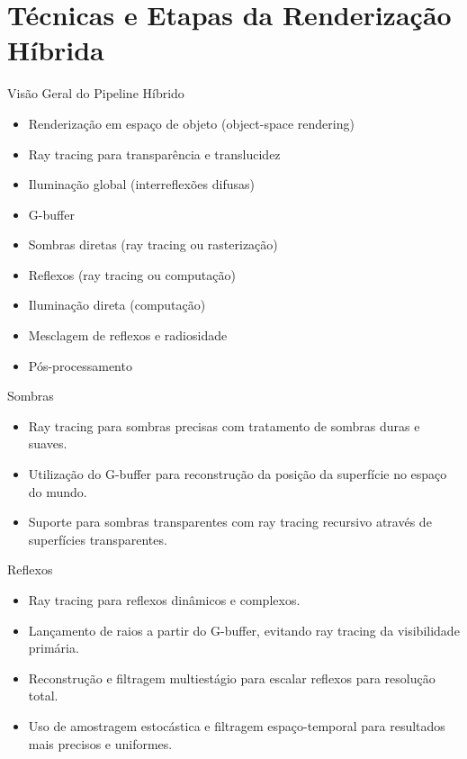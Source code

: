 \documentclass[aspectratio=169,xcolor=table]{beamer}
\begin{document}
\section{Técnicas e Etapas da Renderização Híbrida}
\begin{frame}{Visão Geral do Pipeline Híbrido}
    \begin{itemize}
        \item Renderização em espaço de objeto (object-space rendering)
        \item Ray tracing para transparência e translucidez
        \item Iluminação global (interreflexões difusas)
        \item G-buffer
        \item Sombras diretas (ray tracing ou rasterização)
        \item Reflexos (ray tracing ou computação)
        \item Iluminação direta (computação)
        \item Mesclagem de reflexos e radiosidade
        \item Pós-processamento
    \end{itemize}
\end{frame}

\begin{frame}{Sombras}
    \begin{itemize}
        \item Ray tracing para sombras precisas com tratamento de sombras duras e suaves.
        \item Utilização do G-buffer para reconstrução da posição da superfície no espaço do mundo.
        \item Suporte para sombras transparentes com ray tracing recursivo através de superfícies transparentes.
    \end{itemize}
\end{frame}

\begin{frame}{Reflexos}
    \begin{itemize}
        \item Ray tracing para reflexos dinâmicos e complexos.
        \item Lançamento de raios a partir do G-buffer, evitando ray tracing da visibilidade primária.
        \item Reconstrução e filtragem multiestágio para escalar reflexos para resolução total.
        \item Uso de amostragem estocástica e filtragem espaço-temporal para resultados mais precisos e uniformes.
    \end{itemize}
\end{frame}
\end{document}
